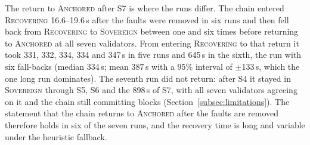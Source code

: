 The return to \textsc{Anchored} after S7 is where the runs differ. The chain entered
\textsc{Recovering} 16.6--19.6\,s after the faults were removed in six runs and then fell
back from \textsc{Recovering} to \textsc{Sovereign} between one and six times before
returning to \textsc{Anchored} at all seven validators. From entering \textsc{Recovering} to that return it took
331, 332, 334, 334 and 347\,s in five runs and 645\,s in the sixth, the run with six
fall-backs (median 334\,s; mean 387\,s with a 95\% interval of $\pm$133\,s, which the one long run dominates).
The seventh run did not return: after S4 it stayed in \textsc{Sovereign} through
S5, S6 and the 898\,s of S7, with all seven validators agreeing on it and the chain still
committing blocks (Section~\ref{subsec:limitations}). The statement that the chain returns to \textsc{Anchored}
after the faults are removed therefore holds in six of the seven runs, and the recovery time
is long and variable under the heuristic fallback.


